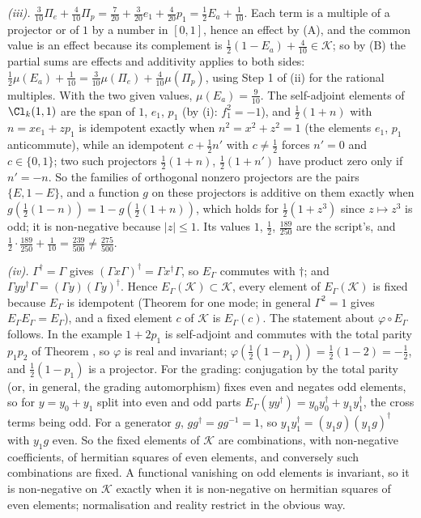 \emph{(iii).} $\tfrac{3}{10}\Pi_{e} + \tfrac{4}{10}\Pi_{p} = \tfrac{7}{20} + \tfrac{3}{20}e_{1} + \tfrac{4}{20}p_{1} = \tfrac12E_{a} + \tfrac{1}{10}$. Each term is a multiple of a projector or of $1$ by a number in $[0,1]$, hence an effect by (A), and the common value is an effect because its complement is $\tfrac12(1 - E_{a}) + \tfrac{4}{10} \in \mathcal{K}$; so by (B) the partial sums are effects and additivity applies to both sides: $\tfrac12\mu(E_{a}) + \tfrac{1}{10} = \tfrac{3}{10}\mu(\Pi_{e}) + \tfrac{4}{10}\mu(\Pi_{p})$, using Step 1 of (ii) for the rational multiples. With the two given values, $\mu(E_{a}) = \tfrac{9}{10}$. The self-adjoint elements of $\Cl_{k}(1,1)$ are the span of $1$, $e_{1}$, $p_{1}$ (by (i): $f_{1}^{2} = -1$), and $\tfrac12(1 + n)$ with $n = xe_{1} + zp_{1}$ is idempotent exactly when $n^{2} = x^{2} + z^{2} = 1$ (the elements $e_{1}$, $p_{1}$ anticommute), while an idempotent $c + \tfrac12 n'$ with $c \ne \tfrac12$ forces $n' = 0$ and $c \in \{0, 1\}$; two such projectors $\tfrac12(1 + n)$, $\tfrac12(1 + n')$ have product zero only if $n' = -n$. So the families of orthogonal nonzero projectors are the pairs $\{E, 1 - E\}$, and a function $g$ on these projectors is additive on them exactly when $g(\tfrac12(1 - n)) = 1 - g(\tfrac12(1 + n))$, which holds for $\tfrac12(1 + z^{3})$ since $z \mapsto z^{3}$ is odd; it is non-negative because $|z| \le 1$. Its values $1$, $\tfrac12$, $\tfrac{189}{250}$ are the script's, and $\tfrac12 \cdot \tfrac{189}{250} + \tfrac{1}{10} = \tfrac{239}{500} \ne \tfrac{275}{500}$.

\emph{(iv).} $\Gamma^{\dagger} = \Gamma$ gives $(\Gamma x\Gamma)^{\dagger} = \Gamma x^{\dagger}\Gamma$, so $E_{\Gamma}$ commutes with $\dagger$; and $\Gamma yy^{\dagger}\Gamma = (\Gamma y)(\Gamma y)^{\dagger}$. Hence $E_{\Gamma}(\mathcal{K}) \subset \mathcal{K}$, every element of $E_{\Gamma}(\mathcal{K})$ is fixed because $E_{\Gamma}$ is idempotent (Theorem  for one mode; in general $\Gamma^{2} = 1$ gives $E_{\Gamma}E_{\Gamma} = E_{\Gamma}$), and a fixed element $c$ of $\mathcal{K}$ is $E_{\Gamma}(c)$. The statement about $\varphi \circ E_{\Gamma}$ follows. In the example $1 + 2p_{1}$ is self-adjoint and commutes with the total parity $p_{1}p_{2}$ of Theorem , so $\varphi$ is real and invariant; $\varphi(\tfrac12(1 - p_{1})) = \tfrac12(1 - 2) = -\tfrac12$, and $\tfrac12(1 - p_{1})$ is a projector. For the grading: conjugation by the total parity (or, in general, the grading automorphism) fixes even and negates odd elements, so for $y = y_{0} + y_{1}$ split into even and odd parts $E_{\Gamma}(yy^{\dagger}) = y_{0}y_{0}^{\dagger} + y_{1}y_{1}^{\dagger}$, the cross terms being odd. For a generator $g$, $gg^{\dagger} = gg^{-1} = 1$, so $y_{1}y_{1}^{\dagger} = (y_{1}g)(y_{1}g)^{\dagger}$ with $y_{1}g$ even. So the fixed elements of $\mathcal{K}$ are combinations, with non-negative coefficients, of hermitian squares of even elements, and conversely such combinations are fixed. A functional vanishing on odd elements is invariant, so it is non-negative on $\mathcal{K}$ exactly when it is non-negative on hermitian squares of even elements; normalisation and reality restrict in the obvious way.

